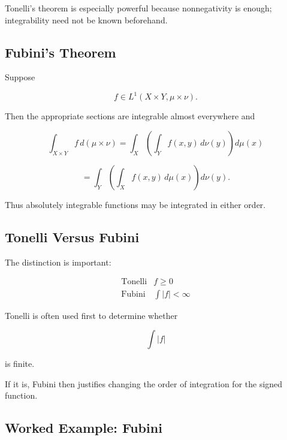 Tonelli's theorem is especially powerful because nonnegativity is enough;
integrability need not be known beforehand.

\subsection{Fubini's Theorem}
\label{subsec:fubinis-theorem}

\begin{theorem}
Suppose

\[
f\in L^1(X\times Y,\mu\times\nu).
\]

Then the appropriate sections are integrable almost everywhere and

\[
\boxed{
\int_{X\times Y}
f\,d(\mu\times\nu)
=
\int_X
\left(
\int_Yf(x,y)\,d\nu(y)
\right)
d\mu(x)
}
\]

\[
\boxed{
=
\int_Y
\left(
\int_Xf(x,y)\,d\mu(x)
\right)
d\nu(y).
}
\]
\end{theorem}

Thus absolutely integrable functions may be integrated in either order.

\subsection{Tonelli Versus Fubini}
\label{subsec:tonelli-versus-fubini}

The distinction is important:

\[
\boxed{
\begin{array}{c|c}
\text{Tonelli} & f\geq0\\
\hline
\text{Fubini} & \int|f|<\infty
\end{array}
}
\]

Tonelli is often used first to determine whether

\[
\int|f|
\]

is finite.

If it is, Fubini then justifies changing the order of integration for the
signed function.

\subsection{Worked Example: Fubini}
\label{subsec:worked-fubini}

